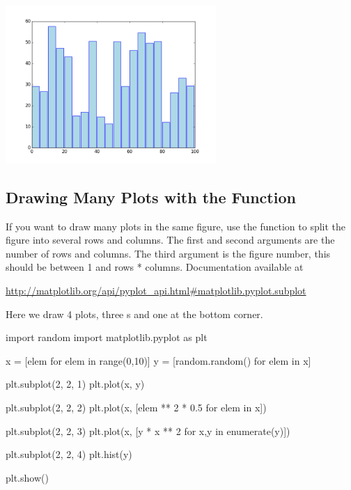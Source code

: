 \documentclass[11pt]{cselabheader}
\begin{document}
\begin{center}
\includegraphics[width=0.6\textwidth]{img/matplotlib_bar.png}
\end{center}

\subsection{Drawing Many Plots with the 
Function}

If you want to draw many plots in the same figure, use the
 function to split the figure into several rows
and columns. The first and second arguments are the number of rows and columns.
The third argument is the figure number, this should be between 1 and
rows * columns. Documentation available at

\begin{center}
\url{http://matplotlib.org/api/pyplot_api.html#matplotlib.pyplot.subplot}
\end{center}

Here we draw 4 plots, three s and one
 at the bottom corner.

\begin{python3code}
import random
import matplotlib.pyplot as plt

x = [elem for elem in range(0,10)]
y = [random.random() for elem in x]

plt.subplot(2, 2, 1)
plt.plot(x, y)

plt.subplot(2, 2, 2)
plt.plot(x, [elem ** 2 * 0.5 for elem in x])

plt.subplot(2, 2, 3)
plt.plot(x, [y * x ** 2 for x,y in enumerate(y)])

plt.subplot(2, 2, 4)
plt.hist(y)

plt.show()
\end{python3code}
\end{document}
